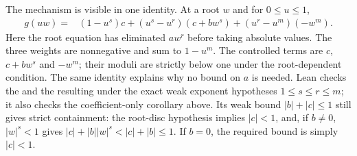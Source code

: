 \documentclass[11pt]{article}
\begin{document}
The mechanism is visible in one identity.  At a root $w$ and for
$0\le u\le1$,
\[
\begin{split}
 g(uw)={}&(1-u^s)c
  +(u^s-u^r)(c+bw^s)
  +(u^r-u^m)(-w^m).
\end{split}
\]
Here the root equation has eliminated $aw^r$ before taking absolute
values. The three weights are nonnegative and sum to $1-u^m$.
The controlled terms are $c$, $c+bw^s$ and $-w^m$; their moduli are
strictly below one under the root-dependent condition. The same
identity explains why no bound on $a$ is needed.
Lean checks the 
and the resulting  under
the exact weak exponent hypotheses $1\le s\le r\le m$; it also checks the
coefficient-only corollary above. Its weak bound $|b|+|c|\le1$ still
gives strict containment: the root-disc hypothesis implies $|c|<1$,
and, if $b\ne0$, $|w|^s<1$ gives
$|c|+|b||w|^s<|c|+|b|\le1$. If $b=0$, the required bound is
simply $|c|<1$.
\end{document}
